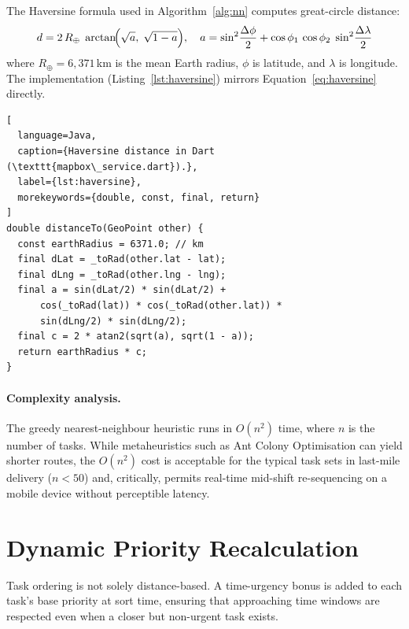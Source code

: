 The Haversine formula used in Algorithm~\ref{alg:nn} computes great-circle
distance:
\begin{equation}
  d = 2\,R_{\oplus}\;\arctan\!\Bigl(
    \sqrt{a},\; \sqrt{1-a}\Bigr),
  \quad
  a = \sin^{2}\!\frac{\Delta\phi}{2}
    + \cos\phi_1\,\cos\phi_2\;\sin^{2}\!\frac{\Delta\lambda}{2}
  \label{eq:haversine}
\end{equation}
where $R_{\oplus} = 6{,}371$\,km is the mean Earth radius, $\phi$ is
latitude, and $\lambda$ is longitude.  The implementation
(Listing~\ref{lst:haversine}) mirrors Equation~\ref{eq:haversine} directly.

\begin{lstlisting}[
  language=Java,
  caption={Haversine distance in Dart (\texttt{mapbox\_service.dart}).},
  label={lst:haversine},
  morekeywords={double, const, final, return}
]
double distanceTo(GeoPoint other) {
  const earthRadius = 6371.0; // km
  final dLat = _toRad(other.lat - lat);
  final dLng = _toRad(other.lng - lng);
  final a = sin(dLat/2) * sin(dLat/2) +
      cos(_toRad(lat)) * cos(_toRad(other.lat)) *
      sin(dLng/2) * sin(dLng/2);
  final c = 2 * atan2(sqrt(a), sqrt(1 - a));
  return earthRadius * c;
}
\end{lstlisting}

\paragraph{Complexity analysis.}
The greedy nearest-neighbour heuristic runs in $O(n^2)$ time, where $n$ is
the number of tasks.  While metaheuristics such as Ant Colony Optimisation
\autocite{dorigo1997ant} can yield shorter routes, the $O(n^2)$ cost is
acceptable for the typical task sets in last-mile delivery ($n < 50$) and,
critically, permits real-time mid-shift re-sequencing on a mobile device
without perceptible latency.

\section{Dynamic Priority Recalculation}
\label{sec:priority-impl}

Task ordering is not solely distance-based.  A time-urgency bonus is added to
each task's base priority at sort time, ensuring that approaching time windows
are respected even when a closer but non-urgent task exists.


